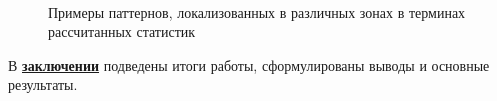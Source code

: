 \begin{figure}[ht]
    \\
    \caption{Примеры паттернов, локализованных в различных зонах в терминах рассчитанных статистик}\label{fig:2d_zoo}
\end{figure}

\FloatBarrier
{}                                  %
В \underline{\textbf{заключении}} подведены итоги работы, сформулированы выводы и основные результаты. 



